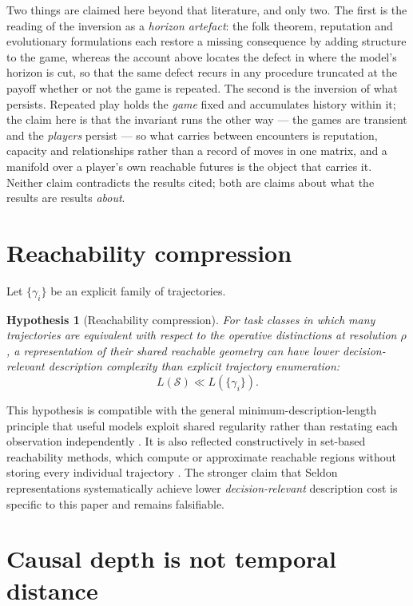 \documentclass[11pt,a4paper]{article}
\newtheorem{hypothesis}[definition]{Hypothesis}
\theoremstyle{remark}
\newcommand{\Seldon}{\mathcal S}
\begin{document}
Two things are claimed here beyond that literature, and only two. The first is the reading of the
inversion as a \emph{horizon artefact}: the folk theorem, reputation and evolutionary formulations
each restore a missing consequence by adding structure to the game, whereas the account above locates
the defect in where the model's horizon is cut, so that the same defect recurs in any procedure
truncated at the payoff whether or not the game is repeated. The second is the inversion of what
persists. Repeated play holds the \emph{game} fixed and accumulates history within it; the claim here
is that the invariant runs the other way --- the games are transient and the \emph{players} persist ---
so what carries between encounters is reputation, capacity and relationships rather than a record of
moves in one matrix, and a manifold over a player's own reachable futures is the object that carries
it. Neither claim contradicts the results cited; both are claims about what the results are results
\emph{about}.

\section{Reachability compression}\label{sec:compression}

Let $\{\gamma_i\}$ be an explicit family of trajectories.

\begin{hypothesis}[Reachability compression]\label{hyp:compression}
For task classes in which many trajectories are equivalent with respect to the operative distinctions at resolution $\rho$, a representation of their shared reachable geometry can have lower decision-relevant description complexity than explicit trajectory enumeration:
\[
L(\Seldon)\ll L(\{\gamma_i\}).
\]
\end{hypothesis}

This hypothesis is compatible with the general minimum-description-length principle that useful models exploit shared regularity rather than restating each observation independently \citep{rissanen1978}. It is also reflected constructively in set-based reachability methods, which compute or approximate reachable regions without storing every individual trajectory \citep{mitchell2005,maidens2013}. The stronger claim that Seldon representations systematically achieve lower \emph{decision-relevant} description cost is specific to this paper and remains falsifiable.

\section{Causal depth is not temporal distance}\label{sec:depth}
\end{document}
